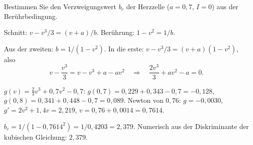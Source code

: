 \begin{aufgabe}
Bestimmen Sie den Verzweigungswert $b_c$ der Herzzelle ($a = 0{,}7$, $I = 0$) aus der Berührbedingung.

\loesung
{}
Schnitt: $v - v^{3}/3 = (v + a)/b$. Berührung: $1 - v^{2} = 1/b$.

Aus der zweiten: $b = 1/(1-v^{2})$. In die erste: $v - v^{3}/3 = (v+a)(1-v^{2})$, also
\[ v - \frac{v^{3}}{3} = v - v^{3} + a - av^{2} \quad\Longrightarrow\quad \frac{2v^{3}}{3} + a v^{2} - a = 0 . \]

$g(v) = \tfrac23 v^{3} + 0{,}7 v^{2} - 0{,}7$: $g(0{,}7) = 0{,}229 + 0{,}343 - 0{,}7 = -0{,}128$, $g(0{,}8) = 0{,}341 + 0{,}448 - 0{,}7 = 0{,}089$. Newton von $0{,}76$: $g = -0{,}0030$, $g' = 2v^{2} + 1{,}4v = 2{,}219$, $v = 0{,}76 + 0{,}0014 = 0{,}7614$.

$b_c = 1/(1 - 0{,}7614^{2}) = 1/0{,}4203 = 2{,}379$. Numerisch aus der Diskriminante der kubischen Gleichung: $2{,}379$. \checkmark

\begin{center}
\begin{minipage}{0.88\textwidth}
\end{minipage}
\end{center}
\end{aufgabe}

